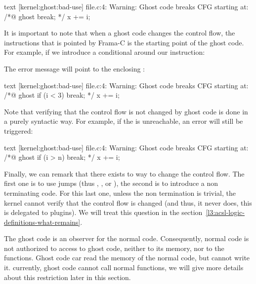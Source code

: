 \begin{CodeBlock}{text}
[kernel:ghost:bad-use] file.c:4: Warning:
  Ghost code breaks CFG starting at:
  /*@ ghost break; */
  x += i;
\end{CodeBlock}


It is important to note that when a ghost code changes the control
flow, the instructions that is pointed by Frama-C is the starting
point of the ghost code. For example, if we introduce a conditional
around our  instruction:




The error message will point to the enclosing :


\begin{CodeBlock}{text}
[kernel:ghost:bad-use] file.c:4: Warning:
  Ghost code breaks CFG starting at:
  /*@ ghost if (i < 3) break; */
  x += i;
\end{CodeBlock}


Note that verifying that the control flow is not changed by ghost
code is done in a purely syntactic way. For example, if the
 is unreachable, an error will still be triggered:




\begin{CodeBlock}{text}
[kernel:ghost:bad-use] file.c:4: Warning:
  Ghost code breaks CFG starting at:
  /*@ ghost if (i > n) break; */
  x += i;
\end{CodeBlock}


Finally, we can remark that there exists to way to change the control
flow. The first one is to use jumps (thus ,
, or ), the second is to
introduce a non terminating code. For this last one, unless the non
termination is trivial, the kernel cannot verify that the control
flow is changed (and thus, it never does, this is delegated to plugins).
We will treat this question in the
section~\ref{l3:acsl-logic-definitions-what-remains}.




The ghost code is an observer for the normal code. Consequently, normal
code is not authorized to access to ghost code, neither to its memory,
nor to the functions. Ghost code car read the memory of the normal code,
but cannot write it. currently, ghost code cannot call normal functions,
we will give more details about this restriction later in this section.


